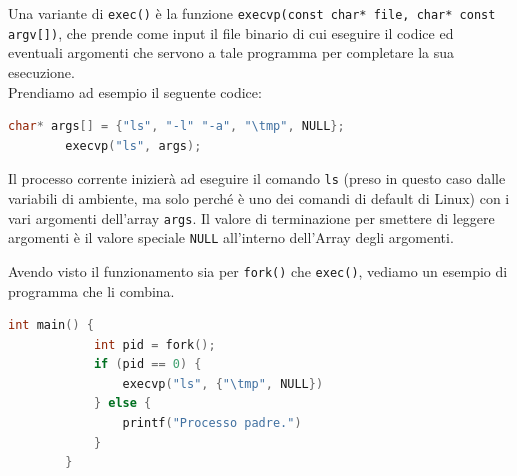 \documentclass[12pt]{report}
\begin{document}
	Una variante di \texttt{exec()} è la funzione \texttt{execvp(const char* file, char* const argv[])}, che prende come input il file binario di cui eseguire il codice ed eventuali argomenti che servono a tale programma per completare la sua esecuzione.\\
	Prendiamo ad esempio il seguente codice:
	\begin{lstlisting}[language=C, caption={Il comando ls serve a listare il contenuto della directory "$\backslash$tmp", e i vari argomenti che iniziano con '-' sono dei flag che compiono operazioni aggiuntive.}]
		char* args[] = {"ls", "-l" "-a", "\tmp", NULL};
		execvp("ls", args);
	\end{lstlisting}
	Il processo corrente inizierà ad eseguire il comando \texttt{ls}	(preso in questo caso dalle variabili di ambiente, ma solo perché è uno dei comandi di default di Linux) con i vari argomenti dell'array \texttt{args}. Il valore di terminazione per smettere di leggere argomenti è il valore speciale \texttt{NULL} all'interno dell'Array degli argomenti.
	\smallbreak
	
	Avendo visto il funzionamento sia per \texttt{fork()} che \texttt{exec()}, vediamo un esempio di programma che li combina.
	\begin{lstlisting}[language=C, caption={Esempio di uso combinato di fork() e execvp(). Si ignorano possibili errori per brevità.}]
		int main() {
			int pid = fork();
			if (pid == 0) {
				execvp("ls", {"\tmp", NULL})
			} else {
				printf("Processo padre.")
			}
		}
	\end{lstlisting}
	
\end{document}
